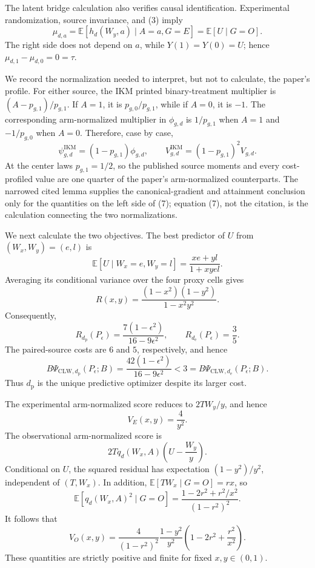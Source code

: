 The latent bridge calculation also verifies causal identification. Experimental randomization, source invariance, and (3) imply
\[
 \mu_{d,a}=\mathbb E[h_d(W_y,a)\mid A=a,G=E]
 =\mathbb E[U\mid G=O]. \tag{6}
\]
The right side does not depend on \(a\), while \(Y(1)=Y(0)=U\); hence \(\mu_{d,1}-\mu_{d,0}=0=\tau\).

We record the normalization needed to interpret, but not to calculate, the paper's profile. For either source, the IKM printed binary-treatment multiplier is \((A-p_{g,1})/p_{g,1}\). If \(A=1\), it is \(p_{g,0}/p_{g,1}\), while if \(A=0\), it is \(-1\). The corresponding arm-normalized multiplier in \(\phi_{g,d}\) is \(1/p_{g,1}\) when \(A=1\) and \(-1/p_{g,0}\) when \(A=0\). Therefore, case by case,
\[
 \psi_{g,d}^{\mathrm{IKM}}=(1-p_{g,1})\phi_{g,d},
 \qquad
 V_{g,d}^{\mathrm{IKM}}=(1-p_{g,1})^2V_{g,d}. \tag{7}
\]
At the center laws \(p_{g,1}=1/2\), so the published source moments and every cost-profiled value are one quarter of the paper's arm-normalized counterparts. The narrowed cited lemma supplies the canonical-gradient and attainment conclusion only for the quantities on the left side of (7); equation (7), not the citation, is the calculation connecting the two normalizations.

We next calculate the two objectives. The best predictor of \(U\) from \((W_x,W_y)=(e,l)\) is
\[
 \mathbb E[U\mid W_x=e,W_y=l]=\frac{xe+yl}{1+xyel}.
\]
Averaging its conditional variance over the four proxy cells gives
\[
 R(x,y)=\frac{(1-x^2)(1-y^2)}{1-x^2y^2}. \tag{8}
\]
Consequently,
\[
 R_{d_{\mathrm p}}(P_\epsilon)
 =\frac{7(1-\epsilon^2)}{16-9\epsilon^2},
 \qquad
 R_{d_{\mathrm e}}(P_\epsilon)=\frac35. \tag{9}
\]
The paired-source costs are \(6\) and \(5\), respectively, and hence
\[
 B\Psi_{\mathrm{CLW},d_{\mathrm p}}(P_\epsilon;B)
 =\frac{42(1-\epsilon^2)}{16-9\epsilon^2}
 <3
 =B\Psi_{\mathrm{CLW},d_{\mathrm e}}(P_\epsilon;B). \tag{10}
\]
Thus \(d_{\mathrm p}\) is the unique predictive optimizer despite its larger cost.

The experimental arm-normalized score reduces to \(2TW_y/y\), and hence
\[
 V_E(x,y)=\frac4{y^2}. \tag{11}
\]
The observational arm-normalized score is
\[
 2Tq_d(W_x,A)\left(U-\frac{W_y}{y}\right).
\]
Conditional on \(U\), the squared residual has expectation \((1-y^2)/y^2\), independent of \((T,W_x)\). In addition, \(\mathbb E[TW_x\mid G=O]=rx\), so
\[
 \mathbb E[q_d(W_x,A)^2\mid G=O]
 =\frac{1-2r^2+r^2/x^2}{(1-r^2)^2}.
\]
It follows that
\[
 V_O(x,y)=
 \frac4{(1-r^2)^2}\frac{1-y^2}{y^2}
 \left(1-2r^2+\frac{r^2}{x^2}\right). \tag{12}
\]
These quantities are strictly positive and finite for fixed \(x,y\in(0,1)\).

